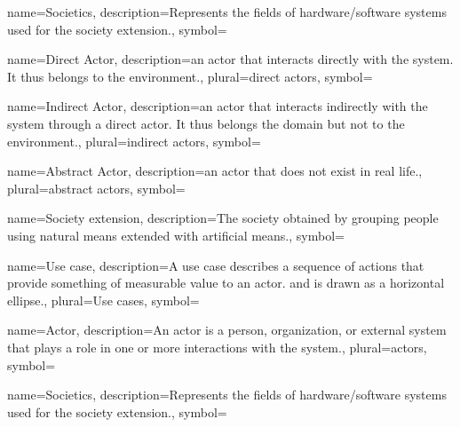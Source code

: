 {name={Societics},
description={Represents the fields of hardware/software
systems used for the society extension.}, 
symbol={}
}

{name={Direct Actor},
description={an actor that interacts directly with the system. It thus belongs
to the environment.},
plural={direct actors},
symbol={}
}

{name={Indirect Actor},
description={an actor that interacts indirectly with the system through a direct
actor.  It thus belongs the domain but not to the environment.}, 
plural={indirect actors},
symbol={}
}

{name={Abstract Actor},
description={an actor that does not exist in real life.},
plural={abstract actors},
symbol={}
}

{name={Society extension},
description={The society obtained by grouping people using natural means
extended with artificial means.},
symbol={}
}

{name={Use case},
description={A use case describes a sequence of actions that provide something
of measurable value to an actor. and is drawn as a horizontal ellipse.},
plural={Use cases}, 
symbol={} 
}

{name={Actor},
description={An actor is a person, organization, or external system that plays a
role in one or more interactions with the system.},
plural={actors},
symbol={}
}

{name={Societics},
description={Represents the fields of hardware/software
systems used for the society extension.},
symbol={}
}

